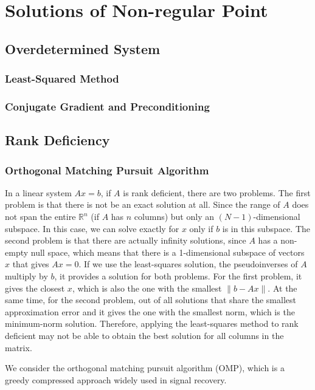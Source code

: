 \chapter{Solutions of Non-regular Point}
\label{cha:result}




\section{Overdetermined System}
\subsection{Least-Squared Method}


\subsection{Conjugate Gradient and Preconditioning}

\section{Rank Deficiency}
\subsection{Orthogonal Matching Pursuit Algorithm}
In a linear system $Ax=b$, if $A$ is rank deficient, there are two problems. The first problem is that there is not be an exact solution at all. Since the range of $A$ does not span the entire $\mathbb{R}^n$ (if $A$ has $n$ columns) but only an $(N-1)$-dimensional subspace. In this case, we can solve exactly for $x$ only if $b$ is in this subspace. The second problem is that there are actually infinity solutions, since $A$ has a non-empty null space, which means that there is a 1-dimensional subspace of vectors $x$ that gives $Ax=0$. If we use the least-squares solution, the pseudoinverses of $A$ multiply by $b$, it provides a solution for both problems. For the first problem, it gives the closest $x$, which is also the one with the smallest $\|b-Ax\|$. At the same time, for the second problem, out of all solutions that share the smallest approximation error and it gives the one with the smallest norm, which is the minimum-norm solution. Therefore, applying the least-squares method to rank deficient may not be able to obtain the best solution for all columns in the matrix. 
\par We consider the orthogonal matching pursuit algorithm (OMP), which is a greedy compressed approach widely used in signal recovery. 


